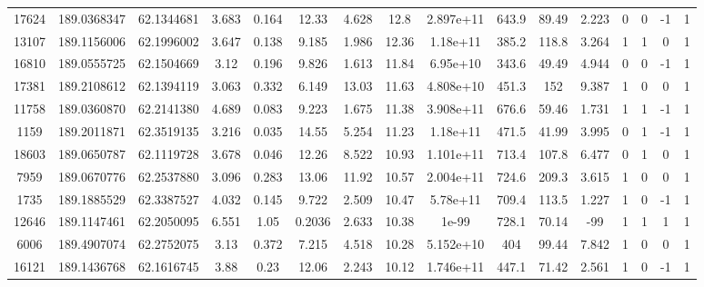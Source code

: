 \begin{table*}
\begin{center}
\begin{tabular}{ cccccccccccccccc }
       17624 & 189.0368347 &  62.1344681 &  3.683 &  0.164 &     12.33 &     4.628 &      12.8 & 2.897e+11 &     643.9 &     89.49 &     2.223 &      0 &      0 &     -1 &        1 \\ 
       13107 & 189.1156006 &  62.1996002 &  3.647 &  0.138 &     9.185 &     1.986 &     12.36 &  1.18e+11 &     385.2 &     118.8 &     3.264 &      1 &      1 &      0 &        1 \\ 
       16810 & 189.0555725 &  62.1504669 &   3.12 &  0.196 &     9.826 &     1.613 &     11.84 &  6.95e+10 &     343.6 &     49.49 &     4.944 &      0 &      0 &     -1 &        1 \\ 
       17381 & 189.2108612 &  62.1394119 &  3.063 &  0.332 &     6.149 &     13.03 &     11.63 & 4.808e+10 &     451.3 &       152 &     9.387 &      1 &      0 &      0 &        1 \\ 
       11758 & 189.0360870 &  62.2141380 &  4.689 &  0.083 &     9.223 &     1.675 &     11.38 & 3.908e+11 &     676.6 &     59.46 &     1.731 &      1 &      1 &     -1 &        1 \\ 
        1159 & 189.2011871 &  62.3519135 &  3.216 &  0.035 &     14.55 &     5.254 &     11.23 &  1.18e+11 &     471.5 &     41.99 &     3.995 &      0 &      1 &     -1 &        1 \\ 
       18603 & 189.0650787 &  62.1119728 &  3.678 &  0.046 &     12.26 &     8.522 &     10.93 & 1.101e+11 &     713.4 &     107.8 &     6.477 &      0 &      1 &      0 &        1 \\ 
        7959 & 189.0670776 &  62.2537880 &  3.096 &  0.283 &     13.06 &     11.92 &     10.57 & 2.004e+11 &     724.6 &     209.3 &     3.615 &      1 &      0 &      0 &        1 \\ 
        1735 & 189.1885529 &  62.3387527 &  4.032 &  0.145 &     9.722 &     2.509 &     10.47 &  5.78e+11 &     709.4 &     113.5 &     1.227 &      1 &      0 &     -1 &        1 \\ 
       12646 & 189.1147461 &  62.2050095 &  6.551 &   1.05 &    0.2036 &     2.633 &     10.38 &     1e-99 &     728.1 &     70.14 &       -99 &      1 &      1 &      1 &        1 \\ 
        6006 & 189.4907074 &  62.2752075 &   3.13 &  0.372 &     7.215 &     4.518 &     10.28 & 5.152e+10 &       404 &     99.44 &     7.842 &      1 &      0 &      0 &        1 \\ 
       16121 & 189.1436768 &  62.1616745 &   3.88 &   0.23 &     12.06 &     2.243 &     10.12 & 1.746e+11 &     447.1 &     71.42 &     2.561 &      1 &      0 &     -1 &        1 \\ 
    
    \hline


\end{tabular}

\begin{minipage}{0.85\textwidth}

    
\end{minipage}

\end{center}

\end{table*}

